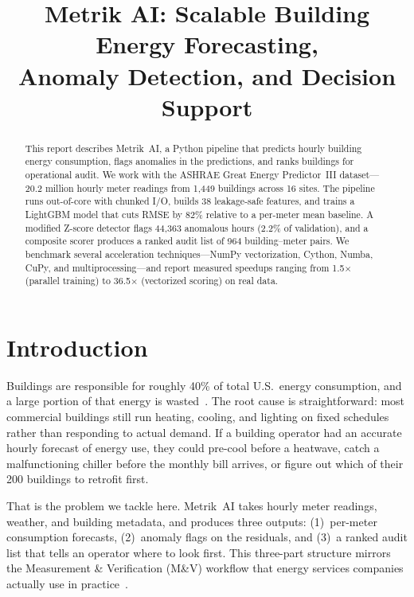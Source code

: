 \documentclass[conference]{IEEEtran}
\title{Metrik AI: Scalable Building Energy Forecasting,\\Anomaly Detection, and Decision Support}
\author{
\IEEEauthorblockN{Akhilesh Vangala}
\IEEEauthorblockA{NYU Center for Data Science\\sv3129@nyu.edu}
\and
\IEEEauthorblockN{Lucas Yao}
\IEEEauthorblockA{NYU Center for Data Science\\ly2808@nyu.edu}
}
\begin{document}
\maketitle

\begin{abstract}
This report describes Metrik~AI, a Python pipeline that predicts hourly building energy consumption, flags anomalies in the predictions, and ranks buildings for operational audit. We work with the ASHRAE Great Energy Predictor~III dataset---20.2 million hourly meter readings from 1,449 buildings across 16 sites. The pipeline runs out-of-core with chunked I/O, builds 38 leakage-safe features, and trains a LightGBM model that cuts RMSE by 82\% relative to a per-meter mean baseline. A modified Z-score detector flags 44,363 anomalous hours (2.2\% of validation), and a composite scorer produces a ranked audit list of 964 building--meter pairs. We benchmark several acceleration techniques---NumPy vectorization, Cython, Numba, CuPy, and multiprocessing---and report measured speedups ranging from 1.5$\times$ (parallel training) to 36.5$\times$ (vectorized scoring) on real data.
\end{abstract}

\section{Introduction}

Buildings are responsible for roughly 40\% of total U.S.\ energy consumption, and a large portion of that energy is wasted~\cite{miller2020}. The root cause is straightforward: most commercial buildings still run heating, cooling, and lighting on fixed schedules rather than responding to actual demand. If a building operator had an accurate hourly forecast of energy use, they could pre-cool before a heatwave, catch a malfunctioning chiller before the monthly bill arrives, or figure out which of their 200 buildings to retrofit first.

That is the problem we tackle here. Metrik~AI takes hourly meter readings, weather, and building metadata, and produces three outputs: (1)~per-meter consumption forecasts, (2)~anomaly flags on the residuals, and (3)~a ranked audit list that tells an operator where to look first. This three-part structure mirrors the Measurement \& Verification (M\&V) workflow that energy services companies actually use in practice~\cite{molina2017}.
\end{document}
